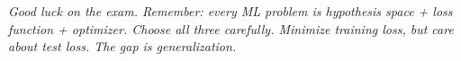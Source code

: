 \documentclass[11pt,a4paper]{article}
\begin{document}
\bigskip

\begin{center}
\emph{Good luck on the exam. Remember: every ML problem is hypothesis space + loss function + optimizer. Choose all three carefully. Minimize training loss, but care about test loss. The gap is generalization.}
\end{center}
\end{document}
